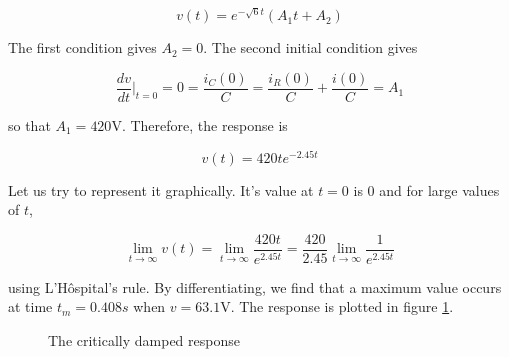 \documentclass[11pt]{article}
\numberwithin{equation}{section}
\begin{document}
\begin{flushleft}
\begin{equation*}
v(t) = e^{-\sqrt{6}t}(A_1t + A_2)
\end{equation*}

The first condition gives $A_2 = 0$. The second initial condition gives

\begin{equation*}
 \frac{dv}{dt}\Biggr|_{t=0} = 0 = \frac{i_C(0)}{C} = \frac{i_R(0)}{C} + \frac{i(0)}{C} = A_1 
\end{equation*}

so that $A_1 = 420 \si{\volt}$. Therefore, the response is

\begin{equation*}
v(t) = 420te^{-2.45t}
\end{equation*}

Let us try to represent it graphically. It's value at $t=0$ is $0$ and for large values of $t$, 

\begin{equation*}
\lim_{t \to \infty}v(t) = \lim_{t \to \infty}\frac{420t}{e^{2.45t}} = \frac{420}{2.45}\lim_{t \to \infty}\frac{1}{e^{2.45t}}
\end{equation*}

using L'H\^{o}spital's rule. By differentiating, we find that a maximum value occurs at time $t_m = 0.408s$ when $v = 63.1\si{\volt}$.
The response is plotted in figure \ref{fig:critical_plot}.

\begin{tcolorbox}
 \begin{figure}[H]
	\centering
  \caption{The critically damped response}
  \label{fig:critical_plot}
\end{figure}%
\end{tcolorbox}

\end{flushleft}
\end{document}
